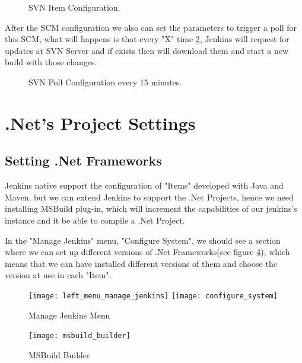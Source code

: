 \documentclass[12pt]{article} %
\begin{document}
\begin{figure}[H] %
	\caption{SVN Item Configuration.}
	\label{fig:svn_item}
\end{figure}

After the SCM configuration we also can set the parameters to trigger a poll for this SCM, what will happens is that every "X" time \ref{fig:svn_poll}, Jenkins will request for updates at SVN Server and if exists then will download them and start a new build with those changes.

\begin{figure}[H] %
	\caption{SVN Poll Configuration every 15 minutes.}
	\label{fig:svn_poll}
\end{figure}


\section{.Net's Project Settings}

\subsection{Setting .Net Frameworks} %

 Jenkins native support the configuration of "Items" developed with Java and Maven, but we can extend Jenkins to support the .Net Projects, hence we need installing MSBuild plug-in, which will increment the capabilities of our jenkins's instance and it be able to compile a .Net Project.
 
In the "Manage Jenkins" menu, "Configure System", we should see a section where we can set up different versions of .Net Frameworks(see figure \ref{fig:msbuild_builder}), which means that we can have installed different versions of them and choose the version at use in each "Item".
 
 \begin{figure}[H] %
 	\center
	{\texttt{[image: left\_menu\_manage\_jenkins]}}
	{\texttt{[image: configure\_system]}}
	\caption{Manage Jenkins Menu}
	\label{fig:left_menu_manage_jenkins}
\end{figure}

 \begin{figure}[H] %
 	\center
	{\texttt{[image: msbuild\_builder]}}
	\caption{MSBuild Builder}
	\label{fig:msbuild_builder}
\end{figure}
\end{document}
